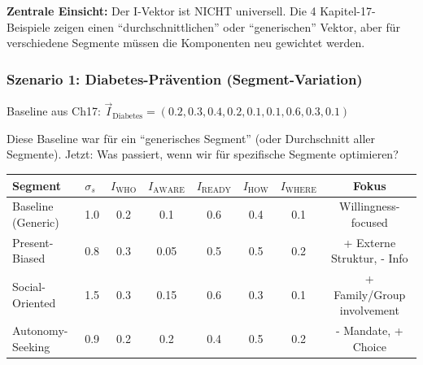 \textbf{Zentrale Einsicht:} Der I-Vektor ist NICHT universell. Die 4 Kapitel-17-Beispiele zeigen einen ``durchschnittlichen'' oder ``generischen'' Vektor, aber für verschiedene Segmente müssen die Komponenten neu gewichtet werden.

\subsubsection{Szenario 1: Diabetes-Prävention (Segment-Variation)}

Baseline aus Ch17: $\vec{I}_{\text{Diabetes}} = (0.2, 0.3, 0.4, 0.2, 0.1, 0.1, 0.6, 0.3, 0.1)$

Diese Baseline war für ein ``generisches Segment'' (oder Durchschnitt aller Segmente). Jetzt: Was passiert, wenn wir für spezifische Segmente optimieren?

\begin{center}
\small
\renewcommand{\arraystretch}{1.3}
\begin{tabular}{@{}llcccccc@{}}
\toprule
\textbf{Segment} & \textbf{$\sigma_s$} & $I_{\text{WHO}}$ & $I_{\text{AWARE}}$ & $I_{\text{READY}}$ & $I_{\text{HOW}}$ & $I_{\text{WHERE}}$ & \textbf{Fokus} \\
\midrule
Baseline (Generic) & 1.0 & 0.2 & 0.1 & 0.6 & 0.4 & 0.1 & Willingness-focused \\
Present-Biased & 0.8 & 0.3 & 0.05 & 0.5 & 0.5 & 0.2 & + Externe Struktur, - Info \\
Social-Oriented & 1.5 & 0.3 & 0.15 & 0.6 & 0.3 & 0.1 & + Family/Group involvement \\
Autonomy-Seeking & 0.9 & 0.2 & 0.2 & 0.4 & 0.5 & 0.2 & - Mandate, + Choice \\
\bottomrule
\end{tabular}
\end{center}

